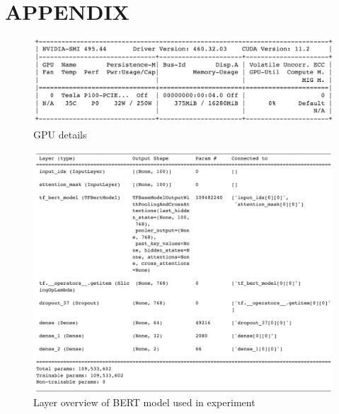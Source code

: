\documentclass[%
	BCOR=8mm, %
	DIV=12,
	toc=bibliography, %
	toc=listof, %
	oneside, %
	egregdoesnotlikesansseriftitles, %
	]{scrbook}
\begin{document}



%
%
\printbibliography

\chapter{APPENDIX}
\label{chapter:appendix}
\begin{figure}[H]
    \centering
    \includegraphics[width=1.0\linewidth]{img/nvidiagpu}
    \caption[Details of GPU]{GPU details}
    \label{fig:nvidiagpu}
\end{figure}
\begin{figure}[H]
    \centering
    \includegraphics[width=0.9\linewidth]{img/bert_arch}
    \caption[ Layer diagram of BERT model used in the experiment]{Layer overview of BERT model used in experiment}
    \label{fig:bertarch}
\end{figure}
\end{document}
